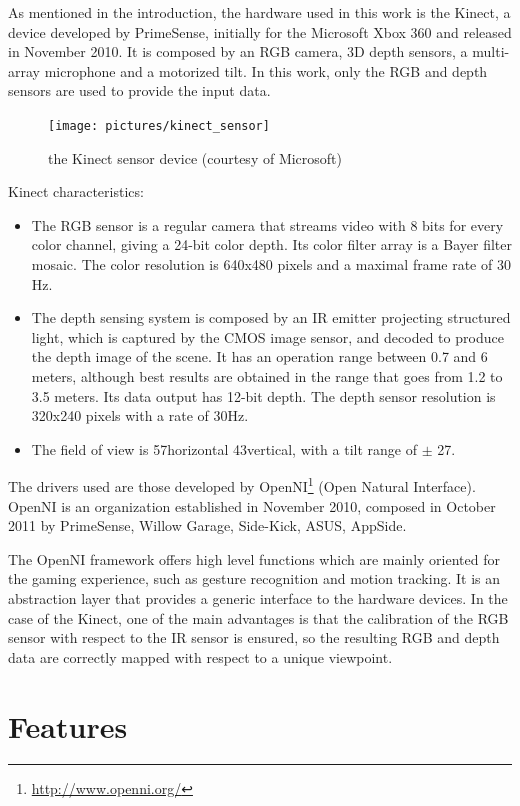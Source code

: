 As mentioned in the introduction, the hardware used in this work is the Kinect, a device developed by PrimeSense, initially for the Microsoft Xbox 360 and released in November 2010. It is composed by an RGB camera, 3D depth sensors, a multi-array microphone and a motorized tilt. In this work, only the RGB and depth sensors are used to provide the input data.

\begin{figure}[H]
\centering
\texttt{[image: pictures/kinect\_sensor]}
\caption{the Kinect sensor device (courtesy of Microsoft)}
\end{figure}

Kinect characteristics:
\begin{itemize}
 \item The RGB sensor is a regular camera that streams video with 8 bits for every color channel, giving a 24-bit color depth. Its  color filter array is a Bayer filter mosaic. The color resolution is 640x480 pixels and a maximal frame rate of 30 Hz.
 \item The depth sensing system is composed by an \gls{IR} emitter projecting structured light, which is captured by the CMOS image sensor, and decoded to produce the depth image of the scene. It has an operation range between 0.7 and 6 meters, although best results are obtained in the range that goes from 1.2 to 3.5 meters. Its data output has 12-bit depth. The depth sensor resolution is 320x240 pixels with a rate of 30Hz.
 \item The field of view is 57\textdegree horizontal 43\textdegree vertical, with a tilt range of $\pm$ 27\textdegree.
\end{itemize}

The drivers used are those developed by OpenNI\footnote{\url{http://www.openni.org/}} (Open Natural Interface). OpenNI is an organization established in November 2010, composed in October 2011 by PrimeSense, Willow Garage, Side-Kick, ASUS, AppSide.

The OpenNI framework offers high level functions which are mainly oriented for the gaming experience, such as gesture recognition and motion tracking. It is an abstraction layer that provides a generic interface to the hardware devices. In the case of the Kinect, one of the main advantages is that the calibration of the RGB sensor with respect to the \gls{IR} sensor is ensured, so the resulting RGB and depth data are correctly mapped with respect to a unique viewpoint.


\section{Features}

